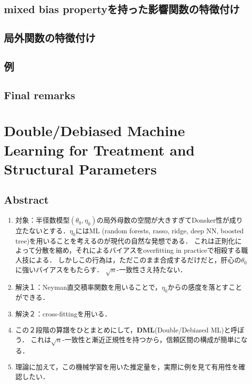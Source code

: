 \documentclass[uplatex,dvipdfmx]{jsreport}
\begin{document}
\subsection{mixed bias propertyを持った影響関数の特徴付け}

\subsection{局外関数の特徴付け}

\subsection{例}

\subsection{Final remarks}



\section{Double/Debiased Machine Learning for Treatment and Structural Parameters \cite{Chernozhukov-Newey-Robins18-Double/Debiased-Machine-Learning}}

\subsection{Abstract}

\begin{enumerate}
    \item 対象：半径数模型$(\theta_0,\eta_0)$の局外母数の空間が大きすぎてDonsker性が成り立たないとする．$\eta_0$にはML (random forests, rasso, ridge, deep NN, boosted tree)を用いることを考えるのが現代の自然な発想である．
    これは正則化によって分散を縮め，それによるバイアスをoverfitting in practiceで相殺する職人技による．
    しかしこの行為は，ただこのまま合成するだけだと，肝心の$\theta_0$に強いバイアスをもたらす．
    $\sqrt{n}$-一致性さえ持たない．
    \item 解決１：Neyman直交積率関数を用いることで，$\eta_0$からの感度を落とすことができる．
    \item 解決２：cross-fittingを用いる．
    \item この２段階の算譜をひとまとめにして，\textbf{DML}(Double/Debiased ML)と呼ぼう．
    これは$\sqrt{n}$-一致性と漸近正規性を持つから，信頼区間の構成が簡単になる．
    \item 理論に加えて，この機械学習を用いた推定量を，実際に例を見て有用性を確認したい．
\end{enumerate}
\end{document}
